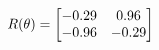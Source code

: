 \documentclass[preview]{standalone}
\begin{document}
\begin{align*}
\special{dvisvgm:raw <g id='unique000'>}R(\theta) = \begin{bmatrix}-0.29 & 0.96\\-0.96 & -0.29\end{bmatrix}\special{dvisvgm:raw </g>}
\end{align*}
\end{document}
